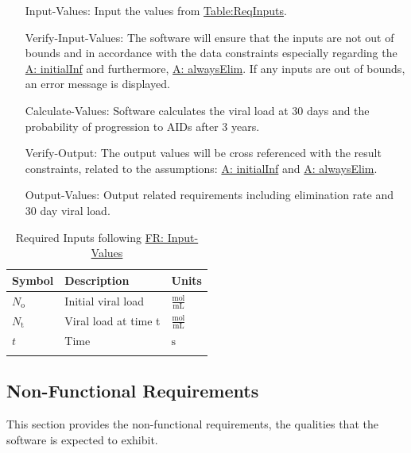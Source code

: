 \documentclass[12pt]{article}
\begin{document}
\begin{itemize}
\item[Input-Values:\phantomsection\label{inputValues}]{Input the values from \hyperref[Table:ReqInputs]{Table:ReqInputs}.}
\item[Verify-Input-Values:\phantomsection\label{verifyInput}]{The software will ensure that the inputs are not   out of bounds and in accordance with the data constraints especially regarding the \hyperref[initialInf]{A: initialInf} and furthermore, \hyperref[alwaysElim]{A: alwaysElim}. If any inputs are out of bounds, an error message is displayed.}
\item[Calculate-Values:\phantomsection\label{calcValues}]{Software calculates the viral load at 30 days and  the probability of progression to AIDs after 3 years.}
\item[Verify-Output:\phantomsection\label{verifyOutput}]{The output values will be cross referenced with  the result constraints, related to the assumptions: \hyperref[initialInf]{A: initialInf} and \hyperref[alwaysElim]{A: alwaysElim}.}
\item[Output-Values:\phantomsection\label{outputValues}]{Output related requirements including elimination rate and 30 day viral load.}
\end{itemize}
\begin{longtable}{l l l}
\toprule
\textbf{Symbol} & \textbf{Description} & \textbf{Units}
\\
\midrule
\endhead
${N_{\text{o}}}$ & Initial viral load & $\frac{\text{mol}}{\text{mL}}$
\\
${N_{\text{t}}}$ & Viral load at time t & $\frac{\text{mol}}{\text{mL}}$
\\
$t$ & Time & ${\text{s}}$
\\
\bottomrule
\caption{Required Inputs following \hyperref[inputValues]{FR: Input-Values}}
\label{Table:ReqInputs}
\end{longtable}
\subsection{Non-Functional Requirements}
\label{Sec:NFRs}
This section provides the non-functional requirements, the qualities that the software is expected to exhibit.
\end{document}
